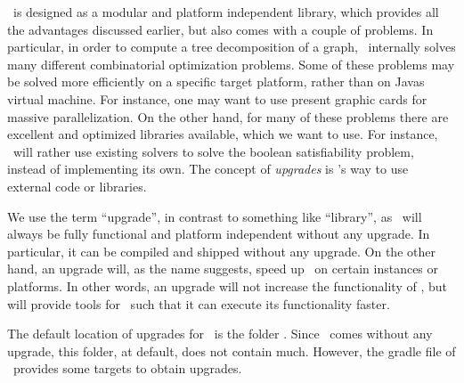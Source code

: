\documentclass[a4paper, ukenglish, twoside, openright]{jdrasilmanual}
\begin{document}
\Jdrasil\ is designed as a modular and platform independent library,
which provides all the advantages discussed earlier, but also comes
with a couple of problems. In particular, in order to compute a tree
decomposition of a graph, \Jdrasil\ internally solves many different
combinatorial optimization problems. Some of these problems may be
solved more efficiently on a specific target platform, rather than on
Javas virtual machine. For instance, one may want to use present
graphic cards for massive parallelization. On the other hand, for many
of these problems there are excellent and optimized libraries
available, which we want to use. For instance, \Jdrasil\ will rather
use existing  solvers to solve the boolean satisfiability
problem, instead of implementing its own. The concept of
\emph{upgrades} is \Jdrasil's way to use external code or
libraries. 

We use the term ``upgrade'', in contrast to something like
``library'', as \Jdrasil\ will always be fully functional and platform
independent without any upgrade. In particular, it can be compiled and
shipped without any upgrade. On the other hand, an upgrade will, as
the name suggests, speed up \Jdrasil\ on certain instances or
platforms. In other words, an upgrade will not increase the
functionality of \Jdrasil, but will provide tools for \Jdrasil\
such that it can execute its functionality faster.

The default location of upgrades for \Jdrasil\ is the folder
. Since \Jdrasil\ comes
without any upgrade, this folder, at default, does not contain
much. However, the gradle file of \Jdrasil\ provides some targets
to obtain upgrades.
\begin{center}
\vfill
{}
\vfill
\end{center}
\end{document}
